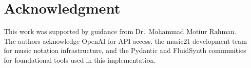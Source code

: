 \documentclass[conference]{IEEEtran}
\begin{document}
\section*{Acknowledgment}

This work was supported by guidance from Dr.\ Mohammad Motiur Rahman. The
authors acknowledge OpenAI for API access, the music21 development team for
music notation infrastructure, and the Pydantic and FluidSynth communities for
foundational tools used in this implementation.


\end{document}
